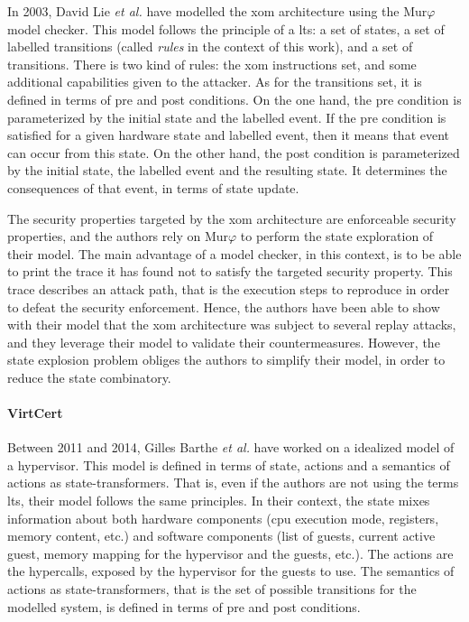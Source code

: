 In 2003, David Lie \emph{et al.} have modelled the \ac{xom} architecture using
the Mur$\varphi$ model checker.
%
This model follows the principle of a \ac{lts}: a set of states, a set of
labelled transitions (called \emph{rules} in the context of this work), and a
set of transitions.
%
There is two kind of rules: the \ac{xom} instructions set, and some additional
capabilities given to the attacker.
%
As for the transitions set, it is defined in terms of pre and post conditions.
%
On the one hand, the pre condition is parameterized by the initial state and the
labelled event.
%
If the pre condition is satisfied for a given hardware state and labelled event,
then it means that event can occur from this state.
%
On the other hand, the post condition is parameterized by the initial state, the
labelled event and the resulting state.
%
It determines the consequences of that event, in terms of state update.

The security properties targeted by the \ac{xom} architecture are enforceable
security properties, and the authors rely on Mur$\varphi$ to perform the state
exploration of their model.
%
The main advantage of a model checker, in this context, is to be able to print the
trace it has found not to satisfy the targeted security property.
%
This trace describes an attack path, that is the execution steps to reproduce in
order to defeat the security enforcement.
%
Hence, the authors have been able to show with their model that the \ac{xom}
architecture was subject to several replay attacks, and they leverage their
model to validate their countermeasures.
%
However, the state explosion problem obliges the authors to simplify their
model, in order to reduce the state combinatory.

\paragraph{VirtCert}
%
Between 2011 and 2014, Gilles Barthe \emph{et al.} have worked on a idealized
model of a hypervisor.
%
This model is defined in terms of state, actions and a semantics of actions as
state-transformers.
%
That is, even if the authors are not using the terms \ac{lts}, their model
follows the same principles.
%
In their context, the state mixes information about both hardware components
(\ac{cpu} execution mode, registers, memory content, etc.) and software
components (list of guests, current active guest, memory mapping for the
hypervisor and the guests, etc.).
%
The actions are the hypercalls, exposed by the hypervisor for the guests to use.
%
The semantics of actions as state-transformers, that is the set of possible
transitions for the modelled system, is defined in terms of pre and post
conditions.


